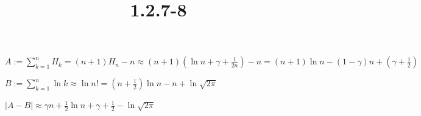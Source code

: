 \documentclass{article}
\title{1.2.7-8}
\begin{document}
\maketitle

 $A:=\sum_{k=1}^n H_k = (n + 1)H_n − n \approx (n + 1)(\ln{n} + \gamma + \frac{1}{2n}) - n = (n + 1)\ln{n} - (1-\gamma) n + (\gamma + \frac{1}{2})$

 $B:=\sum_{k=1}^n \ln{k} \approx \ln n! = (n+\frac{1}{2}) \ln{n} - n + \ln{\sqrt{2\pi}}$

$|A-B| \approx \gamma n + \frac{1}{2} \ln{n} + \gamma + \frac{1}{2} - \ln{\sqrt{2\pi}}$
\end{document}
